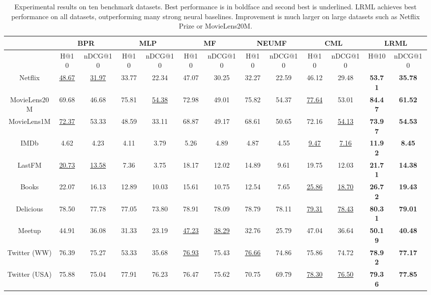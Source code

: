 \documentclass[sigconf]{acmart}
\begin{document}
\begin{table*}[htbp]
  \centering
  \small
    \begin{tabular}{c|cccccccccc|cc}
    \midrule
          & \multicolumn{2}{c}{BPR} & \multicolumn{2}{c}{MLP} & \multicolumn{2}{c}{MF} & \multicolumn{2}{c}{NEUMF}
           & \multicolumn{2}{c}{CML} & \multicolumn{2}{c}{\textsc{LRML}} \\
           \midrule
          & H@10  & nDCG@10 & H@10  & nDCG@10 & H@10  & nDCG@10 & H@10  & nDCG@10 & H@10  & nDCG@10 & H@10  & nDCG@10 \\
          \midrule
    Netflix & \underline{48.67} & \underline{31.97} & 33.77 & 22.34 & 47.07 & 30.25 & 32.27 & 22.59 & 46.12 & 29.48 & \textbf{53.71} & \textbf{35.78} \\
    MovieLens20M & 69.68 & 46.68 & 75.81 & \underline{54.38} & 72.98 & 49.01 & 75.82 & 54.37 & \underline{77.64} & 53.01 & \textbf{84.47} & \textbf{61.52} \\
    MovieLens1M & \underline{72.37} & 53.33 & 48.59 & 33.11 & 68.87 & 49.17 & 68.61 & 50.65 & 72.16 & \underline{54.13} & \textbf{73.97} & \textbf{54.53} \\
    IMDb  & 4.62  & 4.23  & 4.11  & 3.79  & 5.26  & 4.89  & 4.87  & 4.55  & \underline{9.47}  & \underline{7.16}  & \textbf{11.92} & \textbf{8.45} \\
    LastFM & \underline{20.73} & \underline{13.58} & 7.36  & 3.75  & 18.17 & 12.02 & 14.89 & 9.61  & 19.75 & 12.03 & \textbf{21.71} & \textbf{14.38} \\
    Books & 22.07 & 16.13 & 12.89 & 10.03 & 15.61 & 10.75 & 12.54 & 7.65  & \underline{25.86} & \underline{18.70} & \textbf{26.72} & \textbf{19.43} \\
    Delicious & 78.50 & 77.78 & 77.05 & 73.80 & 78.91 & 78.09 & 78.79 & 78.11 & \underline{79.31} & \underline{78.43} & \textbf{80.31} & \textbf{79.01} \\
    Meetup & 44.91 & 36.08 & 31.33 & 23.19 & \underline{47.23} & \underline{38.29} & 32.76 & 25.79 & 47.04 & 36.64 & \textbf{50.19} & \textbf{40.48} \\
    Twitter (WW) & 76.39 & 75.27 & 53.33 & 35.68 & \underline{76.93} & 75.43 & \underline{76.66} & 74.86 & 75.86 & 74.72 & \textbf{78.92} & \textbf{77.17} \\
    Twitter (USA) & 75.88 & 75.04 & 77.91 & 76.23 & 76.47 & 75.62 & 70.75 & 69.79 & \underline{78.30} & \underline{76.50} & \textbf{79.36} & \textbf{77.85} \\
    \midrule
    \end{tabular}\caption{Experimental results on ten benchmark datasets. Best performance is in boldface and second best is underlined. \textsc{LRML} achieves best performance on all datasets, outperforming many strong neural baselines. Improvement is much larger on large datasets such as Netflix Prize or MovieLens20M. }
  \label{tab:exp_results}\end{table*}
\end{document}
